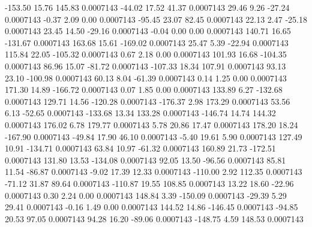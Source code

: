      -153.50       15.76      145.83     0.0007143
      -44.02       17.52       41.37     0.0007143
       29.46        9.26      -27.24     0.0007143
       -0.37        2.09        0.00     0.0007143
      -95.45       23.07       82.45     0.0007143
       22.13        2.47      -25.18     0.0007143
       23.45       14.50      -29.16     0.0007143
       -0.04        0.00        0.00     0.0007143
      140.71       16.65     -131.67     0.0007143
      163.68       15.61     -169.02     0.0007143
       25.47        5.39      -22.94     0.0007143
      115.84       22.05     -105.32     0.0007143
        0.67        2.18        0.00     0.0007143
      101.93       16.68     -104.35     0.0007143
       86.96       15.07      -81.72     0.0007143
     -107.33       18.34      107.91     0.0007143
       93.13       23.10     -100.98     0.0007143
       60.13        8.04      -61.39     0.0007143
        0.14        1.25        0.00     0.0007143
      171.30       14.89     -166.72     0.0007143
        0.07        1.85        0.00     0.0007143
      133.89        6.27     -132.68     0.0007143
      129.71       14.56     -120.28     0.0007143
     -176.37        2.98      173.29     0.0007143
       53.56        6.13      -52.65     0.0007143
     -133.68       13.34      133.28     0.0007143
     -146.74       14.74      144.32     0.0007143
      176.02        6.78      179.77     0.0007143
        5.78       20.86       17.47     0.0007143
      178.20       18.24     -167.90     0.0007143
      -49.84       17.90       46.10     0.0007143
       -5.40       19.61        5.90     0.0007143
      127.49       10.91     -134.71     0.0007143
       63.84       10.97      -61.32     0.0007143
      160.89       21.73     -172.51     0.0007143
      131.80       13.53     -134.08     0.0007143
       92.05       13.50      -96.56     0.0007143
       85.81       11.54      -86.87     0.0007143
       -9.02       17.39       12.33     0.0007143
     -110.00        2.92      112.35     0.0007143
      -71.12       31.87       89.64     0.0007143
     -110.87       19.55      108.85     0.0007143
       13.22       18.60      -22.96     0.0007143
        0.30        2.24        0.00     0.0007143
      148.84        3.39     -150.09     0.0007143
      -29.39        5.29       29.41     0.0007143
       -0.16        1.49        0.00     0.0007143
      144.52       14.86     -146.45     0.0007143
      -94.85       20.53       97.05     0.0007143
       94.28       16.20      -89.06     0.0007143
     -148.75        4.59      148.53     0.0007143
